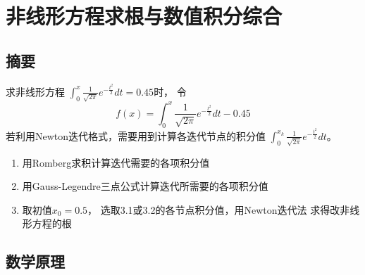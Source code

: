 \documentclass{article}
\begin{document}
\newpage
\section{非线形方程求根与数值积分综合}
\subsection{摘要}
求非线形方程
$\int_0^x\frac{1}{\sqrt{2\pi}}e^{-\frac{t^2}{2}}dt=0.45$时，
令
\begin{equation}
    f(x) = \int_0^x\frac{1}{\sqrt{2\pi}}e^{-\frac{t^2}{2}}dt - 0.45    
\end{equation}
若利用Newton迭代格式，需要用到计算各迭代节点的积分值
$\int_0^{x_k}\frac{1}{\sqrt{2\pi}}e^{-\frac{t^2}{2}}dt$。

\begin{enumerate}
    \item 用Romberg求积计算迭代需要的各项积分值
    \item 用Gauss-Legendre三点公式计算迭代所需要的各项积分值
    \item 取初值\texorpdfstring{$x_0=0.5$}{}，
        选取3.1或3.2的各节点积分值，用Newton迭代法
        求得改非线形方程的根
\end{enumerate}

\subsection{数学原理}
\end{document}
